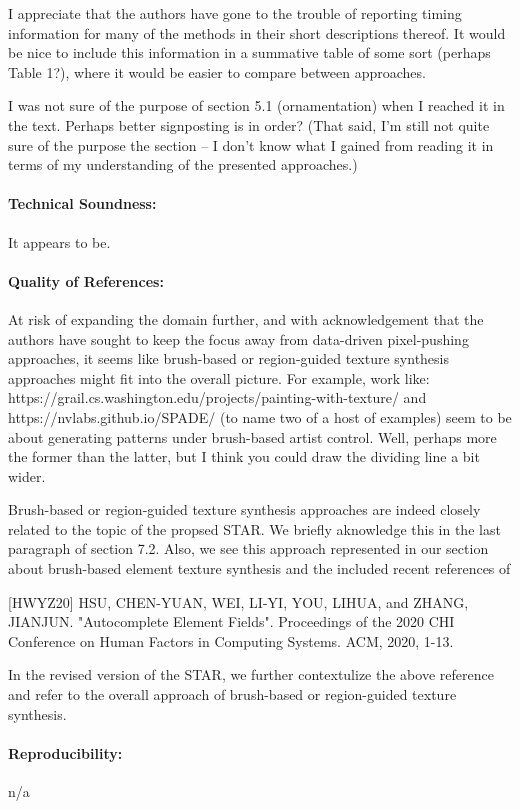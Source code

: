 \documentclass{egpubl}
\newcommand{\rev}[2]{{\color{greenrev}\textsuperscript{#1}#2}}
\renewcommand{\rev}[2]{{#2}}
\begin{document}
I appreciate that the authors have gone to the trouble of reporting timing information for many of the methods in their short descriptions thereof. It would be nice to include this information in a summative table of some sort (perhaps Table 1?), where it would be easier to compare between approaches.

I was not sure of the purpose of section 5.1 (ornamentation) when I reached it in the text. Perhaps better signposting is in order? (That said, I'm still not quite sure of the purpose the section -- I don't know what I gained from reading it in terms of my understanding of the presented approaches.)
\paragraph*{Technical Soundness:} It appears to be.
\paragraph*{Quality of References:} At risk of expanding the domain further, and with acknowledgement that the authors have sought to keep the focus away from data-driven pixel-pushing approaches,  it seems like brush-based or region-guided texture synthesis approaches might fit into the overall picture. For example, work like:
https://grail.cs.washington.edu/projects/painting-with-texture/
and https://nvlabs.github.io/SPADE/
(to name two of a host of examples)
seem to be about generating patterns under brush-based artist control. Well, perhaps more the former than the latter, but I think you could draw the dividing line a bit wider.

\rev{Comment}{
    Brush-based or region-guided texture synthesis approaches are indeed closely related to the topic of the propsed STAR. We briefly aknowledge this in the last paragraph of section 7.2. 
    Also, we see this approach represented in our section about brush-based element texture synthesis and the included recent references of 

    [HWYZ20]  HSU, CHEN-YUAN, WEI, LI-YI, YOU, LIHUA, and ZHANG, JIANJUN. "Autocomplete Element Fields". Proceedings of the 2020 CHI Conference on Human Factors in Computing Systems. ACM, 2020, 1-13.

    In the revised version of the STAR, we further contextulize the above reference and refer to the overall approach of brush-based or region-guided texture synthesis.
}

\paragraph*{Reproducibility:} n/a
\end{document}
